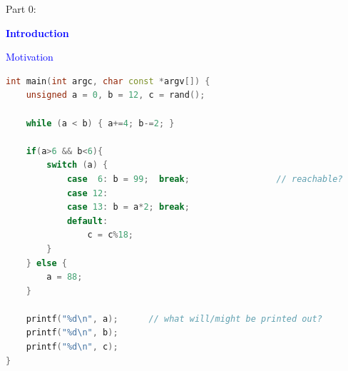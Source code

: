 \begin{frame}

Part 0:
\vspace{0.2cm}

{\LARGE \textbf{\textcolor{blue}{Introduction}}}

\end{frame}
\begin{frame}[fragile]{\textcolor{blue}{Motivation}}
\begin{footnotesize}
\begin{lstlisting}[language=C++]
int main(int argc, char const *argv[]) {
    unsigned a = 0, b = 12, c = rand();

    while (a < b) { a+=4; b-=2; }

    if(a>6 && b<6){
        switch (a) {
            case  6: b = 99;  break;                 // reachable? 
            case 12:
            case 13: b = a*2; break;
            default:
                c = c%18;
        }
    } else {
        a = 88;
    }

    printf("%d\n", a);		// what will/might be printed out?
    printf("%d\n", b);
    printf("%d\n", c);
}
\end{lstlisting}
\end{footnotesize}
\end{frame}
